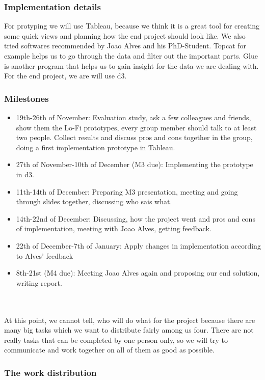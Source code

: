 \documentclass{article}
\begin{document}
\subsubsection {Implementation details}
For protyping we will use Tableau, because we think it is a great tool for creating some quick views and planning how the end project should look like. We also tried softwares recommended by Joao Alves and his PhD-Student. Topcat for example helps us to go through the data and filter out the important parts. Glue is another program that helps us to gain insight for the data we are dealing with. \\
For the end project, we are will use d3.

\subsubsection {Milestones}
\begin{itemize}

\item 19th-26th of November: Evaluation study, ask a few colleagues and 		friends, show them the Lo-Fi prototypes, every group member should 	talk to at least two people. Collect results and discuss pros and 		cons together in the group, doing a first implementation prototype 	in Tableau.
\item 	27th of November-10th of December (M3 due): Implementing 	the prototype in d3.
\item 	11th-14th of December: Preparing M3 presentation, meeting and going 		through slides together, discussing who sais what.
\item 	14th-22nd of December: Discussing, how the project went and pros and 	cons of implementation, meeting with Joao Alves, getting feedback.
\item 	22th of December-7th of January: Apply changes in 		implementation according to Alves' feedback
\item 	8th-21st (M4 due): Meeting Joao Alves again and proposing our end 	solution, writing report.
\end{itemize}
\\ \\
At this point, we cannot tell, who will do what for the project because there are many big tasks which we want to distribute fairly among us four. There are not really tasks that can be completed by one person only, so we will try to communicate and work together on all of them as good as possible.

\subsubsection {The work distribution}
\end{document}
